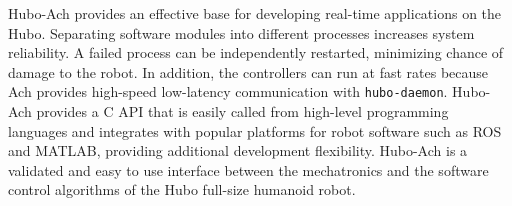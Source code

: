 Hubo-Ach provides an effective base for developing real-time
applications on the Hubo.  Separating software modules into different
processes increases system reliability.  A failed process can be
independently restarted, minimizing chance of damage to the robot.  In
addition, the controllers can run at fast rates because Ach provides
high-speed low-latency communication with {\tt hubo-daemon}.  Hubo-Ach
provides a C API that is easily called from high-level programming
languages and integrates with popular platforms for robot software
such as ROS and MATLAB, providing additional development flexibility.
Hubo-Ach is a validated and easy to use interface between the
mechatronics and the software control algorithms of the Hubo full-size
humanoid robot.


